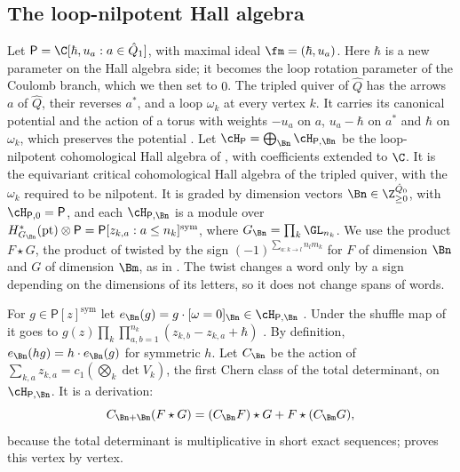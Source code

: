 \subsection{The loop-nilpotent Hall algebra}\label{ss:bps-hall}
Let $\mathsf P=\C[\hbar,u_a:a\in\hat Q_1]$, with maximal ideal
$\fm=(\hbar,u_a)$.  Here $\hbar$ is a new parameter on the Hall algebra side; it
becomes the loop rotation parameter of the Coulomb branch, which we then set
to $0$.  The tripled quiver of $\hat Q$ has the arrows $a$ of $\hat Q$, their
reverses $a^*$, and a loop $\omega_k$ at every vertex $k$.  It carries its
canonical potential and the action of a torus with weights $-u_a$ on $a$,
$u_a-\hbar$ on $a^*$ and $\hbar$ on $\omega_k$, which preserves the potential
\cite[\S3.1]{jindalLoopNilpotent2026}.  Let
$\cH_{\mathsf P}=\bigoplus_{\Bn}\cH_{\mathsf P,\Bn}$ be the loop-nilpotent
cohomological Hall algebra of \cite[\S3]{jindalLoopNilpotent2026}, with
coefficients extended to $\C$.  It is the equivariant critical cohomological
Hall algebra of the tripled quiver, with the $\omega_k$ required to be
nilpotent.  It is graded by dimension vectors
$\Bn\in\Z_{\ge0}^{\hat Q_0}$, with $\cH_{\mathsf P,0}=\mathsf P$, and each
$\cH_{\mathsf P,\Bn}$ is a module over
$H^*_{G_\Bn}(\mathrm{pt})\otimes\mathsf P=\mathsf P[z_{k,a}:a\le n_k]^{\mathrm{sym}}$, where
$G_\Bn=\prod_k\GL_{n_k}$.  We use the product $F\star G$, the product of
\cite{jindalLoopNilpotent2026} twisted by the sign
$(-1)^{\sum_{a\colon k\to l}n_lm_k}$ for $F$ of dimension $\Bn$ and $G$ of
dimension $\Bm$, as in .  The twist changes a word only by a sign
depending on the dimensions of its letters, so it does not change spans of
words.

For $g\in\mathsf P[z]^{\mathrm{sym}}$ let $e_\Bn(g)=g\cdot[\omega=0]_\Bn\in\cH_{\mathsf
P,\Bn}$ \cite[(98)]{jindalLoopNilpotent2026}.  Under the shuffle map of
\cite[\S3]{jindalLoopNilpotent2026} it goes to
$g(z)\prod_k\prod_{a,b=1}^{n_k}(z_{k,b}-z_{k,a}+\hbar)$
\cite[Lemma~3.6]{jindalLoopNilpotent2026}.  By definition,
$e_\Bn(hg)=h\cdot e_\Bn(g)$ for symmetric $h$.  Let $C_\Bn$ be the action of
$\sum_{k,a}z_{k,a}=c_1(\bigotimes_k\det V_k)$, the first Chern class of the
total determinant, on $\cH_{\mathsf P,\Bn}$.  It is a derivation:
\begin{equation}\label{eq:bps-derivation}
 C_{\Bn+\Bm}(F\star G)=(C_\Bn F)\star G+F\star(C_\Bm G),
\end{equation}
because the total determinant is multiplicative in short exact sequences;
\cite[Prop.~4.1]{davisonAffineBPS2022} proves this vertex by vertex.

